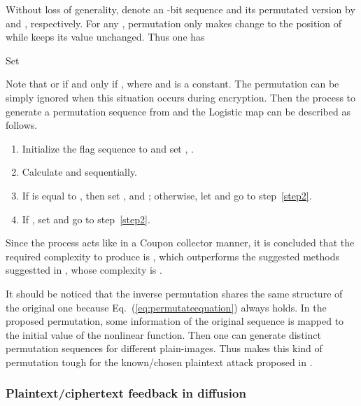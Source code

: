 \documentclass[3p,preprint,11pt]{elsarticle}
\begin{document}
Without loss of generality, denote an -bit sequence and its permutated version by 
and , respectively. For any , permutation only makes change
to the position of  while keeps its value unchanged. Thus one has

Set

Note that  or  if and only if , where  and  is a
constant. The permutation can be simply ignored when this situation occurs during encryption.
Then the process to generate a permutation sequence  from  and the Logistic map can be described as follows.
\begin{enumerate}[{step}  1:]
\item Initialize the flag sequence  to  and set , .
\item{\label{step2}} Calculate  and  sequentially.
\item If  is equal to , then set ,  and ; otherwise, let  and go to step~\ref{step2}.
\item If , set  and go to step~\ref{step2}.
\end{enumerate}
Since the process acts like in a Coupon collector \cite[Sec.~3.6]{Motwani:RandomAlgo:Cambridge95} manner, it is concluded that the required complexity to
produce  is , which outperforms the suggested methods suggestted in \cite{Fouda:fastblock:CNSNS14}, whose complexity
is .



It should be noticed that the inverse permutation shares the same structure of the original one because Eq.~(\ref{eq:permutateequation}) always holds. In the proposed permutation, some information of the
original sequence  is mapped to the initial value of the nonlinear function.
Then one can generate distinct permutation sequences  for different plain-images.
Thus makes this kind of permutation tough for the known/chosen plaintext attack proposed in \cite{Chengqing:OptimalofPermutation:SG11, Shujun:quantitativePermutation:SGIC08}.




\subsubsection{Plaintext/ciphertext feedback in diffusion}
\label{sec:diffusion}
\end{document}
